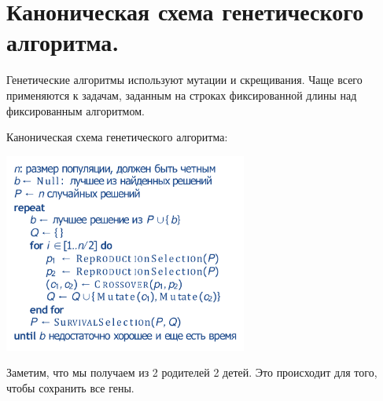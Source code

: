 \section{Каноническая схема генетического алгоритма.}

Генетические алгоритмы используют мутации и скрещивания. Чаще всего применяются к задачам, заданным на строках фиксированной длины над фиксированным алгоритмом. 

Каноническая схема генетического алгоритма:


\includegraphics[width=8cm]{images/13biletH}



Заметим, что мы получаем из 2 родителей 2 детей. Это происходит для того, чтобы сохранить все гены.
